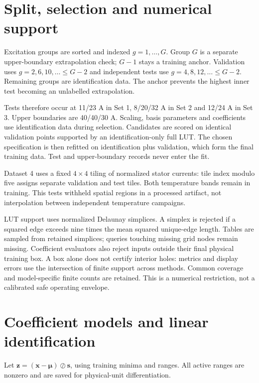 \documentclass[11pt,a4paper]{article}
\begin{document}
\section{Split, selection and numerical support}
Excitation groups are sorted and indexed $g=1,\ldots,G$. Group $G$ is a separate upper-boundary extrapolation check; $G-1$ stays a training anchor. Validation uses $g=2,6,10,\ldots\leq G-2$ and independent tests use $g=4,8,12,\ldots\leq G-2$. Remaining groups are identification data. The anchor prevents the highest inner test becoming an unlabelled extrapolation.

Tests therefore occur at 11/23 A in Set 1, 8/20/32 A in Set 2 and 12/24 A in Set 3. Upper boundaries are 40/40/30 A. Scaling, basis parameters and coefficients use identification data during selection. Candidates are scored on identical validation points supported by an identification-only full LUT. The chosen specification is then refitted on identification plus validation, which form the final training data. Test and upper-boundary records never enter the fit.

Dataset 4 uses a fixed $4\times4$ tiling of normalized stator currents: tile index modulo five assigns separate validation and test tiles. Both temperature bands remain in training. This tests withheld spatial regions in a processed artifact, not interpolation between independent temperature campaigns.

LUT support uses normalized Delaunay simplices. A simplex is rejected if a squared edge exceeds nine times the mean squared unique-edge length. Tables are sampled from retained simplices; queries touching missing grid nodes remain missing. Coefficient evaluators also reject inputs outside their final physical training box. A box alone does not certify interior holes: metrics and display errors use the intersection of finite support across methods. Common coverage and model-specific finite counts are retained. This is a numerical restriction, not a calibrated safe operating envelope.

\section{Coefficient models and linear identification}
Let $\bm z=(\bm x-\bm\mu)\oslash\bm s$, using training minima and ranges. All active ranges are nonzero and are saved for physical-unit differentiation.
\end{document}
